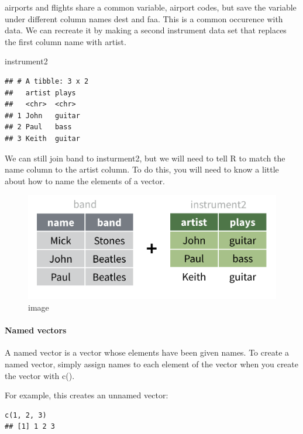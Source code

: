\documentclass[
]{article}
\newenvironment{Shaded}{\begin{snugshade}}{\end{snugshade}}
\newcommand{\NormalTok}[1]{#1}
\begin{document}
airports and flights share a common variable, airport codes, but save
the variable under different column names dest and faa. This is a common
occurence with data. We can recreate it by making a second instrument
data set that replaces the first column name with artist.

\begin{Shaded}
\begin{Highlighting}[]
\NormalTok{instrument2}
\end{Highlighting}
\end{Shaded}

\begin{verbatim}
## # A tibble: 3 x 2
##   artist plays 
##   <chr>  <chr> 
## 1 John   guitar
## 2 Paul   bass  
## 3 Keith  guitar
\end{verbatim}

We can still join band to insturment2, but we will need to tell R to
match the name column to the artist column. To do this, you will need to
know a little about how to name the elements of a vector.

\begin{figure}
\centering
\includegraphics{data/names.png}
\caption{image}
\end{figure}

\hypertarget{named-vectors}{%
\paragraph{Named vectors}\label{named-vectors}}

A named vector is a vector whose elements have been given names. To
create a named vector, simply assign names to each element of the vector
when you create the vector with c().

For example, this creates an unnamed vector:

\begin{verbatim}
c(1, 2, 3)
## [1] 1 2 3
\end{verbatim}
\end{document}
